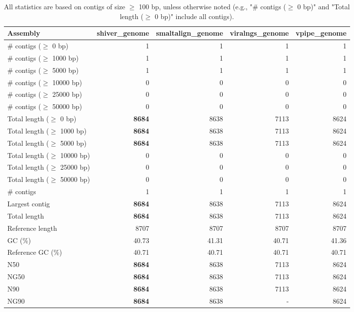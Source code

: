 \documentclass[12pt,a4paper]{article}
\begin{document}
\begin{table}[ht]
\begin{center}
\caption{All statistics are based on contigs of size $\geq$ 100 bp, unless otherwise noted (e.g., "\# contigs ($\geq$ 0 bp)" and "Total length ($\geq$ 0 bp)" include all contigs).}
\begin{tabular}{|l*{4}{|r}|}
\hline
Assembly & shiver\_genome & smaltalign\_genome & viralngs\_genome & vpipe\_genome \\ \hline
\# contigs ($\geq$ 0 bp) & 1 & 1 & 1 & 1 \\ \hline
\# contigs ($\geq$ 1000 bp) & 1 & 1 & 1 & 1 \\ \hline
\# contigs ($\geq$ 5000 bp) & 1 & 1 & 1 & 1 \\ \hline
\# contigs ($\geq$ 10000 bp) & 0 & 0 & 0 & 0 \\ \hline
\# contigs ($\geq$ 25000 bp) & 0 & 0 & 0 & 0 \\ \hline
\# contigs ($\geq$ 50000 bp) & 0 & 0 & 0 & 0 \\ \hline
Total length ($\geq$ 0 bp) & {\bf 8684} & 8638 & 7113 & 8624 \\ \hline
Total length ($\geq$ 1000 bp) & {\bf 8684} & 8638 & 7113 & 8624 \\ \hline
Total length ($\geq$ 5000 bp) & {\bf 8684} & 8638 & 7113 & 8624 \\ \hline
Total length ($\geq$ 10000 bp) & 0 & 0 & 0 & 0 \\ \hline
Total length ($\geq$ 25000 bp) & 0 & 0 & 0 & 0 \\ \hline
Total length ($\geq$ 50000 bp) & 0 & 0 & 0 & 0 \\ \hline
\# contigs & 1 & 1 & 1 & 1 \\ \hline
Largest contig & {\bf 8684} & 8638 & 7113 & 8624 \\ \hline
Total length & {\bf 8684} & 8638 & 7113 & 8624 \\ \hline
Reference length & 8707 & 8707 & 8707 & 8707 \\ \hline
GC (\%) & 40.73 & 41.31 & 40.71 & 41.36 \\ \hline
Reference GC (\%) & 40.71 & 40.71 & 40.71 & 40.71 \\ \hline
N50 & {\bf 8684} & 8638 & 7113 & 8624 \\ \hline
NG50 & {\bf 8684} & 8638 & 7113 & 8624 \\ \hline
N90 & {\bf 8684} & 8638 & 7113 & 8624 \\ \hline
NG90 & {\bf 8684} & 8638 & - & 8624 \\ \hline

\end{tabular}
\end{center}
\end{table}
\end{document}
